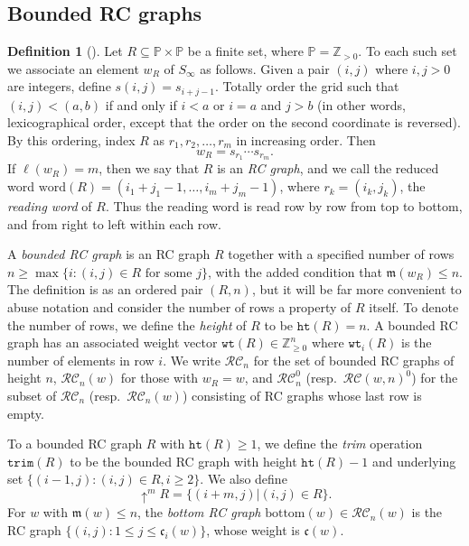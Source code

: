\documentclass{amsart}
\theoremstyle{definition}
\newtheorem{definition}[lemma]{Definition}
\theoremstyle{remark}
\numberwithin{equation}{subsection}
\newcommand{\shup}{{\uparrow}}
\newcommand{\wof}[1]{w_{#1}}
\newcommand{\wtt}{\mathtt{wt}}
\newcommand{\trm}{\mathtt{trim}}
\newcommand{\hr}{\mathtt{ht}}
\newcommand{\RC}{\mathcal{RC}}
\newcommand{\code}{\mathfrak{c}}
\newcommand{\maxd}{\mathfrak{m}}
\begin{document}
\subsection{Bounded RC graphs}\label{section:brc}

\begin{definition}[{\cite[Definition~\ref*{B-definition:rcgraph}]{samuelbialgebra}}]\label{definition:rcgraph}
	Let $R\subseteq \mathbb{P}\times \mathbb{P}$ be a finite set, where $\mathbb{P}=\mathbb{Z}_{>0}$. To each such set we associate an element $\wof{R}$ of $S_\infty$ as follows. Given a pair $(i, j)$ where $i,j>0$ are integers, define $s(i,j) = s_{i+j - 1}$. Totally order the grid such that $(i, j) < (a, b)$ if and only if $i < a$ or $i = a$ and $j > b$ (in other words, lexicographical order, except that the order on the second coordinate is reversed). By this ordering, index $R$ as $r_1, r_2,\ldots, r_m$ in increasing order. Then
	$$\wof{R} = s_{r_1}\cdots s_{r_m}.$$
	If $\ell(\wof{R}) = m$, then we say that $R$ is an \emph{RC graph}, and we call the reduced word $\mathrm{word}(R)=(i_1+j_1-1,\ldots,i_m+j_m-1)$, where $r_k=(i_k,j_k)$, the \emph{reading word} of $R$. Thus the reading word is read row by row from top to bottom, and from right to left within each row.
	
	A \emph{bounded RC graph} is an RC graph $R$ together with a specified number of rows $n\geq \max\{i: (i,j)\in R\text{ for some }j\}$, with the added condition that $\maxd(\wof{R})\leq n$. The definition is as an ordered pair $(R, n)$, but it will be far more convenient to abuse notation and consider the number of rows a property of $R$ itself. To denote the number of rows, we define the \emph{height} of $R$ to be $\hr(R)=n$. A bounded RC graph has an associated weight vector $\wtt(R)\in\mathbb{Z}_{\geq 0}^n$ where $\wtt_i(R)$ is the number of elements in row $i$. We write $\RC_n$ for the set of bounded RC graphs of height $n$, $\RC_n(w)$ for those with $\wof{R}=w$, and $\RC_n^0$ (resp.\ $\RC(w,n)^0$) for the subset of $\RC_n$ (resp.\ $\RC_n(w)$) consisting of RC graphs whose last row is empty.
	
	To a bounded RC graph $R$ with $\hr(R)\geq 1$, we define the \emph{trim} operation $\trm(R)$ to be the bounded RC graph with height $\hr(R)-1$ and underlying set $\{(i-1, j): (i,j)\in R, i\geq 2\}$. We also define
	$$\shup^m R=\{(i+m, j)| (i,j)\in R\}.$$
	For $w$ with $\maxd(w)\leq n$, the \emph{bottom RC graph} $\mathrm{bottom}(w)\in\RC_n(w)$ is the RC graph $\{(i,j): 1\leq j\leq \code_i(w)\}$, whose weight is $\code(w)$.
\end{definition}
\end{document}
